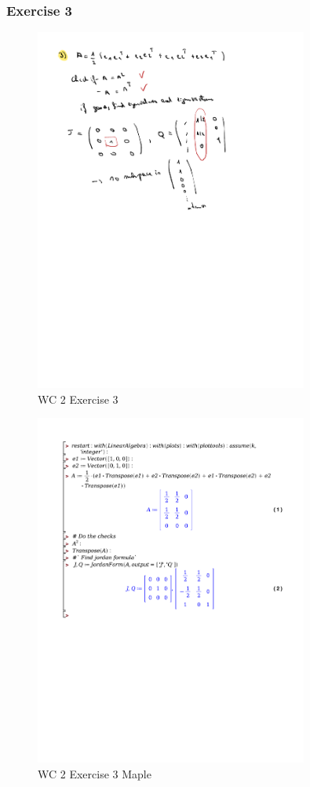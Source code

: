 \documentclass[a4paper]{report}
\begin{document}
\subsubsection{Exercise 3}

\begin{figure}[H]
	\centering
	\includegraphics[width=0.8\textwidth]{assets/wc_2_ex_3.pdf}
	\caption{WC 2 Exercise 3}
\end{figure}

\begin{figure}[H]
	\centering
	\includegraphics[width=0.8\textwidth]{exercises/wc_2_ex_3.pdf}
	\caption{WC 2 Exercise 3 Maple}
	\label{fig:wc_2_ex_3_maple}
\end{figure}
\end{document}
